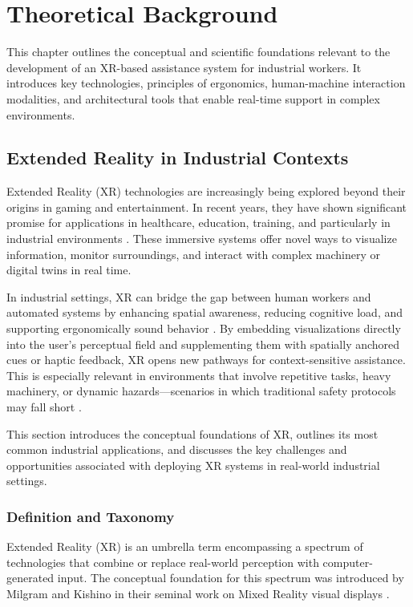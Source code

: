 \chapter{Theoretical Background}
\label{chap:theoretical_background}

This chapter outlines the conceptual and scientific foundations relevant to the development of an XR-based assistance system for industrial workers. It introduces key technologies, principles of ergonomics, human-machine interaction modalities, and architectural tools that enable real-time support in complex environments.

\section{Extended Reality in Industrial Contexts}
Extended Reality (XR) technologies are increasingly being explored beyond their origins in gaming and entertainment. In recent years, they have shown significant promise for applications in healthcare, education, training, and particularly in industrial environments \cite{palmarini2018ar,portman2022xrsurvey}. These immersive systems offer novel ways to visualize information, monitor surroundings, and interact with complex machinery or digital twins in real time.

In industrial settings, XR can bridge the gap between human workers and automated systems by enhancing spatial awareness, reducing cognitive load, and supporting ergonomically sound behavior \cite{makransky2019vrlearning,nee2012ar}. By embedding visualizations directly into the user's perceptual field and supplementing them with spatially anchored cues or haptic feedback, XR opens new pathways for context-sensitive assistance. This is especially relevant in environments that involve repetitive tasks, heavy machinery, or dynamic hazards—scenarios in which traditional safety protocols may fall short \cite{palmarini2018ar}.

This section introduces the conceptual foundations of XR, outlines its most common industrial applications, and discusses the key challenges and opportunities associated with deploying XR systems in real-world industrial settings.


\subsection{Definition and Taxonomy}

Extended Reality (XR) is an umbrella term encompassing a spectrum of technologies that combine or replace real-world perception with computer-generated input. The conceptual foundation for this spectrum was introduced by Milgram and Kishino in their seminal work on Mixed Reality visual displays \cite{milgram1994taxonomy}.

